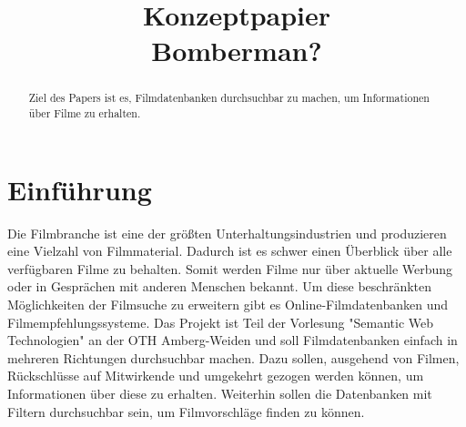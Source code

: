 \documentclass[conference]{IEEEtran}
\begin{document}
\title{Konzeptpapier\\Bomberman?}

\author{
	\and

	\and

	\and

	\and

}

\maketitle

\begin{abstract}
	Ziel des Papers ist es, Filmdatenbanken durchsuchbar zu machen, um Informationen über Filme zu erhalten.
\end{abstract}


\section{Einführung}

Die Filmbranche ist eine der größten Unterhaltungsindustrien und produzieren eine Vielzahl von Filmmaterial.
Dadurch ist es schwer einen Überblick über alle verfügbaren Filme zu behalten.
Somit werden Filme nur über aktuelle Werbung oder in Gesprächen mit anderen Menschen bekannt.
Um diese beschränkten Möglichkeiten der Filmsuche zu erweitern gibt es Online-Filmdatenbanken und Filmempfehlungssysteme.
Das Projekt ist Teil der Vorlesung "Semantic Web Technologien" an der OTH Amberg-Weiden und soll Filmdatenbanken einfach in mehreren Richtungen durchsuchbar machen.
Dazu sollen, ausgehend von Filmen, Rückschlüsse auf Mitwirkende und umgekehrt gezogen werden können, um Informationen über diese zu erhalten.
Weiterhin sollen die Datenbanken mit Filtern durchsuchbar sein, um Filmvorschläge finden zu können.
\end{document}
